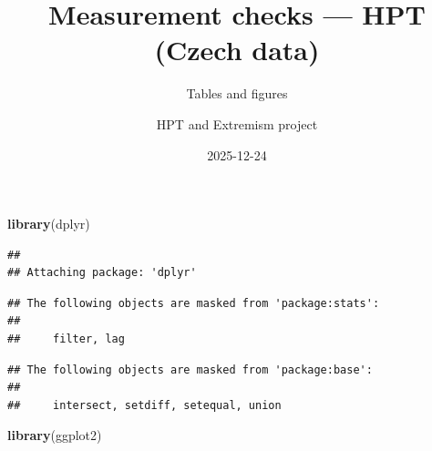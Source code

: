 \documentclass[
  10pt,
]{article}
\title{Measurement checks --- HPT (Czech data)}
\subtitle{Tables and figures}
\author{HPT and Extremism project}
\date{2025-12-24}
\newenvironment{Shaded}{\begin{snugshade}}{\end{snugshade}}
\newcommand{\FunctionTok}[1]{\textcolor[rgb]{0.13,0.29,0.53}{\textbf{#1}}}
\newcommand{\NormalTok}[1]{#1}
\begin{document}
\maketitle

{
\setcounter{tocdepth}{3}
\tableofcontents
}
\begin{Shaded}
\begin{Highlighting}[]
\FunctionTok{library}\NormalTok{(dplyr)}
\end{Highlighting}
\end{Shaded}

\begin{verbatim}
## 
## Attaching package: 'dplyr'
\end{verbatim}

\begin{verbatim}
## The following objects are masked from 'package:stats':
## 
##     filter, lag
\end{verbatim}

\begin{verbatim}
## The following objects are masked from 'package:base':
## 
##     intersect, setdiff, setequal, union
\end{verbatim}

\begin{Shaded}
\begin{Highlighting}[]
\FunctionTok{library}\NormalTok{(ggplot2)}
\end{Highlighting}
\end{Shaded}
\end{document}
